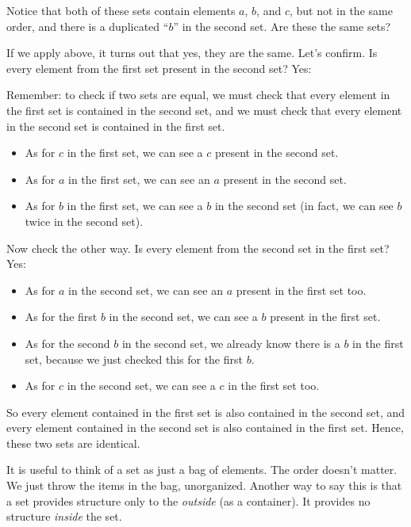 \documentclass[../../../main.tex]{subfiles}
\begin{document}
Notice that both of these sets contain elements $a$, $b$, and $c$, but not in the same order, and there is a duplicated ``$b$'' in the second set. Are these the same sets? 

If we apply  above, it turns out that yes, they are the same. Let's confirm. Is every element from the first set present in the second set? Yes:

\begin{aside}
  \begin{remark}
    Remember: to check if two sets are equal, we must check that every element in the first set is contained in the second set, and we must check that every element in the second set is contained in the first set.
  \end{remark}
\end{aside}

\begin{itemize}
  \item As for $c$ in the first set, we can see a $c$ present in the second set.
  \item As for $a$ in the first set, we can see an $a$ present in the second set.
  \item As for $b$ in the first set, we can see a $b$ in the second set (in fact, we can see $b$ twice in the second set). 
\end{itemize}
  
\noindent
Now check the other way. Is every element from the second set in the first set? Yes: 

\begin{itemize}
  \item As for $a$ in the second set, we can see an $a$ present in the first set too.
  \item As for the first $b$ in the second set, we can see a $b$ present in the first set.
  \item As for the second $b$ in the second set, we already know there is a $b$ in the first set, because we just checked this for the first $b$.
  \item As for $c$ in the second set, we can see a $c$ in the first set too.
\end{itemize}

\noindent
So every element contained in the first set is also contained in the second set, and every element contained in the second set is also contained in the first set. Hence, these two sets are identical.

\begin{aside}
  \begin{remark}
    It is useful to think of a set as just a bag of elements. The order doesn't matter. We just throw the items in the bag, unorganized. Another way to say this is that a set provides structure only to the \emph{outside} (as a container). It provides no structure \emph{inside} the set.
  \end{remark}
\end{aside}
\end{document}
